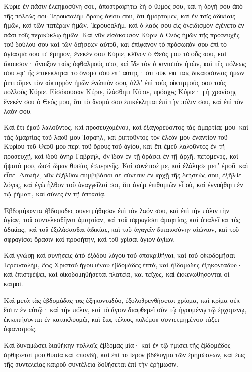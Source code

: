 {\par }{\PP {}Κύριε ἐν πᾶσιν ἐλεημοσύνη σου, ἀποστραφήτω δὴ ὁ θυμός σου, καὶ ἡ ὀργή σου ἀπὸ τῆς πόλεώς σου Ἱερουσαλὴμ ὄρους ἁγίου σου, ὅτι ἡμάρτομεν, καὶ ἐν ταῖς ἀδικίαις ἡμῶν, καὶ τῶν πατέρων ἡμῶν, Ἱερουσαλὴμ, καὶ ὁ λαός σου εἰς ὀνειδισμὸν ἐγένετο ἐν πᾶσι τοῖς περικύκλῳ ἡμῶν.
Καὶ νῦν εἰσάκουσον Κύριε ὁ Θεὸς ἡμῶν τῆς προσευχῆς τοῦ δούλου σου καὶ τῶν δεήσεων αὐτοῦ, καὶ ἐπίφανον τὸ πρόσωπόν σου ἐπὶ τὸ ἁγίασμά σου τὸ ἔρημον, ἔνεκέν σου Κύριε,
κλῖνον ὁ Θεός μου τὸ οὖς σου, καὶ ἄκουσον· ἄνοιξον τοὺς ὀφθαλμούς σου, καὶ ἴδε τὸν ἀφανισμὸν ἡμῶν, καὶ τῆς πόλεως σου ἐφʼ ἧς ἐπικέκληται τὸ ὄνομά σου ἐπʼ αὐτῆς· ὅτι οὐκ ἐπὶ ταῖς δικαιοσύναις ἡμῶν ῥιπτοῦμεν τὸν οἰκτιρμὸν ἡμῶν ἐνώπιόν σου, ἀλλʼ ἐπὶ τοὺς οἰκτιρμούς σου τοὺς πολλοὺς Κύριε.
Εἰσάκουσον Κύριε, ἱλάσθητι Κύριε, πρόσχες Κύριε· μὴ χρονίσῃς ἕνεκέν σου ὁ Θεός μου, ὅτι τὸ ὄνομά σου ἐπικέκληται ἐπὶ τὴν πόλιν σου, καὶ ἐπὶ τὸν λαόν σου.
\par }{\PP {}Καὶ ἔτι ἐμοῦ λαλοῦντος, καὶ προσευχομένου, καὶ ἐξαγορεύοντος τὰς ἁμαρτίας μου, καὶ τὰς ἁμαρτίας τοῦ λαοῦ μου Ἰσραὴλ, καὶ ῥιπτοῦντος τὸν ἔλεόν μου ἐναντίον τοῦ Κυρίου τοῦ Θεοῦ μου περὶ τοῦ ὄρους τοῦ ἁγίου,
καὶ ἔτι ἐμοῦ λαλοῦντος ἐν τῇ προσευχῇ, καὶ ἰδοὺ ἀνὴρ Γαβριὴλ, ὃν ἴδον ἐν τῇ ὁράσει ἐν τῇ ἀρχῆ, πετόμενος, καὶ ἥψατό μου, ὡσεὶ ὥραν θυσίας ἑσπερινῆς.
Καὶ συνέτισέ με, καὶ ἐλάλησε μετʼ ἐμοῦ, καὶ εἶπε, Δανιὴλ, νῦν ἐξῆλθον συμβιβάσαι σε σύνεσιν
ἐν ἀρχῇ τῆς δεήσεώς σου, ἐξῆλθε λόγος, καὶ ἐγὼ ἦλθον τοῦ ἀναγγεῖλαί σοι, ὅτι ἀνὴρ ἐπιθυμιῶν εἶ σὺ, καὶ ἐννοήθητι ἐν τῷ ῥήματι, καὶ σύνες ἐν τῇ ὀπτασίᾳ.
\par }{\PP {}Ἑβδομήκοντα ἑβδομάδες συνετμήθησαν ἐπὶ τὸν λαόν σου, καὶ ἐπὶ τὴν πόλιν τὴν ἁγίαν, τοῦ συντελεσθῆναι ἁμαρτίαν, καὶ τοῦ σφραγίσαι ἁμαρτίας, καὶ ἀπαλεῖψαι τὰς ἀδικίας, καὶ τοῦ ἐξιλάσασθαι ἀδικίας, καὶ τοῦ ἀγαγεῖν δικαιοσύνην αἰώνιον, καὶ τοῦ σφραγίσαι ὅρασιν καὶ προφήτην, καὶ τοῦ χρίσαι ἅγιον ἁγίων.
\par }{\PP {}Καὶ γνώσῃ καὶ συνήσεις ἀπὸ ἐξόδου λόγου τοῦ ἀποκριθῆναι, καὶ τοῦ οἰκοδομῆσαι Ἱερουσαλὴμ, ἓως Χριστοῦ ἡγουμένου ἑβδομάδες ἑπτὰ, καὶ ἑβδομάδες ἑξηκονταδύο· καὶ ἐπιστρέψει, καὶ οἰκοδομηθήσεται πλατεία, καὶ τεῖχος, καὶ ἐκκενωθήσονται οἱ καιροί.
\par }{\PP {}Καὶ μετὰ τὰς ἑβδομάδας τὰς ἑξηκονταδύο, ἐξολοθρενθήσεται χρίσμα, καὶ κρίμα οὐκ ἔστιν ἐν αὐτῷ· καὶ τὴν πόλιν, καὶ τὸ ἅγιον διαφθερεῖ σὺν τῷ ἡγουμένῳ τῷ ἐρχομένῳ, ἐκκοπήσονται ἐν κατακλυσμῷ, καὶ ἕως τέλους πολέμου συντετμημένου τάξει, ἀφανισμοίς.
\par }{\PP {}Καὶ δυναμώσει διαθήκην πολλοῖς ἑβδομὰς μία· καὶ ἐν τῷ ἡμίσει τῆς ἑβδομάδος ἀρθήσεταί μου θυσία καὶ σπονδὴ, καὶ ἐπὶ τὸ ἱερὸν βδέλυγμα τῶν ἐρημώσεων, καὶ ἕως τῆς συντελείας καιροῦ συντέλεια δοθήσεται ἐπὶ τὴν ἐρήμωσιν.

}
